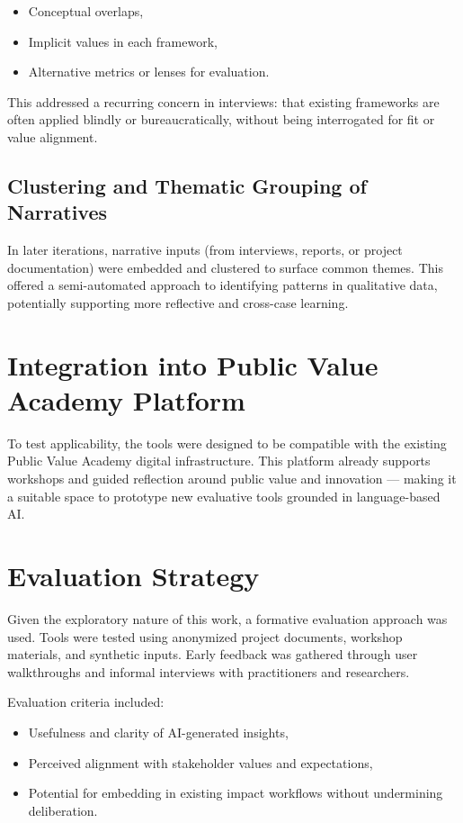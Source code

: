 \begin{itemize}
    \item Conceptual overlaps,
    \item Implicit values in each framework,
    \item Alternative metrics or lenses for evaluation.
\end{itemize}

This addressed a recurring concern in interviews: that existing frameworks are often applied blindly or bureaucratically, without being interrogated for fit or value alignment.

\subsection{Clustering and Thematic Grouping of Narratives}

In later iterations, narrative inputs (from interviews, reports, or project documentation) were embedded and clustered to surface common themes. This offered a semi-automated approach to identifying patterns in qualitative data, potentially supporting more reflective and cross-case learning.

\section{Integration into Public Value Academy Platform}

To test applicability, the tools were designed to be compatible with the existing Public Value Academy digital infrastructure. This platform already supports workshops and guided reflection around public value and innovation — making it a suitable space to prototype new evaluative tools grounded in language-based AI.

\section{Evaluation Strategy}

Given the exploratory nature of this work, a formative evaluation approach was used. Tools were tested using anonymized project documents, workshop materials, and synthetic inputs. Early feedback was gathered through user walkthroughs and informal interviews with practitioners and researchers.

Evaluation criteria included:

\begin{itemize}
    \item Usefulness and clarity of AI-generated insights,
    \item Perceived alignment with stakeholder values and expectations,
    \item Potential for embedding in existing impact workflows without undermining deliberation.
\end{itemize}

